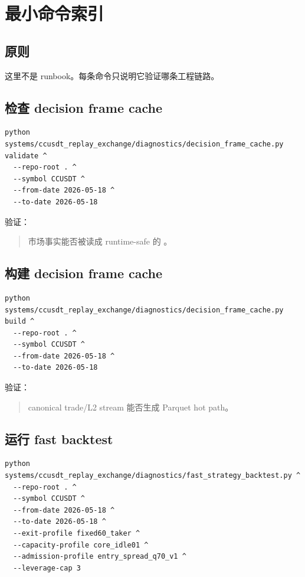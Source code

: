 \chapter{最小命令索引}

\section{原则}

这里不是 runbook。每条命令只说明它验证哪条工程链路。

\section{检查 decision frame cache}

\begin{lstlisting}
python systems/ccusdt_replay_exchange/diagnostics/decision_frame_cache.py validate ^
  --repo-root . ^
  --symbol CCUSDT ^
  --from-date 2026-05-18 ^
  --to-date 2026-05-18
\end{lstlisting}

验证：

\begin{quote}
市场事实能否被读成 runtime-safe 的 。
\end{quote}

\section{构建 decision frame cache}

\begin{lstlisting}
python systems/ccusdt_replay_exchange/diagnostics/decision_frame_cache.py build ^
  --repo-root . ^
  --symbol CCUSDT ^
  --from-date 2026-05-18 ^
  --to-date 2026-05-18
\end{lstlisting}

验证：

\begin{quote}
canonical trade/L2 stream 能否生成 Parquet hot path。
\end{quote}

\section{运行 fast backtest}

\begin{lstlisting}
python systems/ccusdt_replay_exchange/diagnostics/fast_strategy_backtest.py ^
  --repo-root . ^
  --symbol CCUSDT ^
  --from-date 2026-05-18 ^
  --to-date 2026-05-18 ^
  --exit-profile fixed60_taker ^
  --capacity-profile core_idle01 ^
  --admission-profile entry_spread_q70_v1 ^
  --leverage-cap 3
\end{lstlisting}

